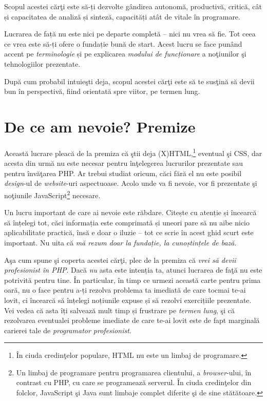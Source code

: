 Scopul acestei cărţi este să-ți dezvolte gândirea autonomă, productivă,
critică, cât și capacitatea de analiză și sinteză, capacități atât de vitale
în programare.

Lucrarea de față nu este nici pe departe completă -- nici nu vrea să fie.
Tot ceea ce vrea este să-ți ofere o fundație bună de start. Acest lucru se 
face punând accent pe \textit{terminologie} și pe explicarea
\textit{modului de funcționare} a noţiunilor şi tehnologiilor prezentate.

După cum probabil intuieşti deja, scopul acestei cărţi este să
te susţină să devii bun în perspectivă, fiind orientată spre
viitor, pe termen lung.

{}
\section*{De ce am nevoie? Premize}
Această lucrare pleacă de la premiza că ştii deja (X)HTML,\footnote{În
ciuda credinţelor populare, HTML nu este un limbaj de programare.} eventual şi CSS, dar
acesta din urmă nu este necesar pentru înţelegerea lucrurilor prezentate
sau pentru învăţarea PHP. Ar trebui
studiat oricum, căci fără el nu este posibil \textsl{design}-ul de
\textsl{website}-uri aspectuoase.
Acolo unde va fi nevoie, vor fi prezentate şi noţiunile JavaScript\footnote{Un
limbaj de programare pentru programarea clientului, a \textsl{browser}-ului,
în contrast cu PHP, cu care se programează \glqq serverul\grqq.
În ciuda credinţelor din folclor, JavaScript şi Java sunt limbaje complet
diferite şi de sine stătătoare.} necesare.

Un lucru important de care ai nevoie este răbdare. Citește cu
atenție și încearcă să înțelegi tot, căci informația este comprimată
și uneori pare să nu aibe nicio aplicabilitate practică, însă e doar o
iluzie -- tot ce scrie în acest ghid scurt este important. Nu uita că
\textit{mă rezum doar la fundație, la cunoștințele de bază}.

Aşa cum spune şi coperta acestei cărţi, plec de la premiza că
\textit{vrei să devii profesionist în PHP}. Dacă \textit{nu} asta este intenția ta,
atunci lucrarea de faţă nu este potrivită pentru tine.
În particular, în timp ce urmezi această carte pentru prima oară, nu o face
pentru a-ți rezolva problema ta imediată de care tocmai te-ai lovit, ci
încearcă să înțelegi noțiunile expuse și să rezolvi exercițiile prezentate.
Vei vedea că asta îți salvează mult timp și frustrare pe \textit{termen lung},
şi că rezolvarea eventualei probleme imediate de care te-ai lovit este de fapt
marginală carierei tale de \textit{programator profesionist}.


